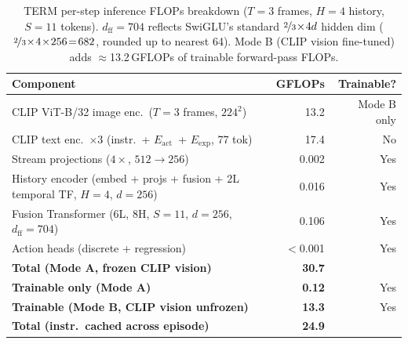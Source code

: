 \documentclass{article}
\newcommand{\Lact}{$E_{\mathrm{act}}$\xspace}
\newcommand{\Lexp}{$E_{\mathrm{exp}}$\xspace}
\begin{document}
\begin{table}[h]
\centering
\caption{TERM per-step inference FLOPs breakdown ($T{=}3$ frames, $H{=}4$ history, $S{=}11$ tokens).
         $d_{\mathrm{ff}}{=}704$ reflects SwiGLU's standard $\nicefrac{2}{3}\!\times\!4d$ hidden dim
         ($\nicefrac{2}{3}\!\times\!4\!\times\!256\!=\!682$, rounded up to nearest 64).
         Mode B (CLIP vision fine-tuned) adds ${\approx}$13.2\,GFLOPs of trainable forward-pass FLOPs.}
\label{tab:flops}
\small
\begin{tabular}{lrr}
\toprule
\textbf{Component} & \textbf{GFLOPs} & \textbf{Trainable?} \\
\midrule
CLIP ViT-B/32 image enc.\ ($T{=}3$ frames, $224^2$) & 13.2  & Mode B only  \\
CLIP text enc.\ $\times3$ (instr.\ + \Lact\ + \Lexp, 77 tok) & 17.4  & No  \\
\midrule
Stream projections ($4\times$, $512\!\to\!256$)  & 0.002 & Yes \\
History encoder (embed + projs + fusion + 2L temporal TF, $H{=}4$, $d{=}256$) & 0.016 & Yes \\
Fusion Transformer (6L, 8H, $S{=}11$, $d{=}256$, $d_{\mathrm{ff}}{=}704$) & 0.106 & Yes \\
Action heads (discrete + regression)             & $<$0.001 & Yes \\
\midrule
\textbf{Total (Mode A, frozen CLIP vision)}          & \textbf{30.7}  &     \\
\textbf{Trainable only (Mode A)}                     & \textbf{0.12}  & Yes \\
\textbf{Trainable (Mode B, CLIP vision unfrozen)}    & \textbf{13.3}  & Yes \\
\textbf{Total (instr.\ cached across episode)}       & \textbf{24.9} & \\
\bottomrule
\end{tabular}
\end{table}
\end{document}
